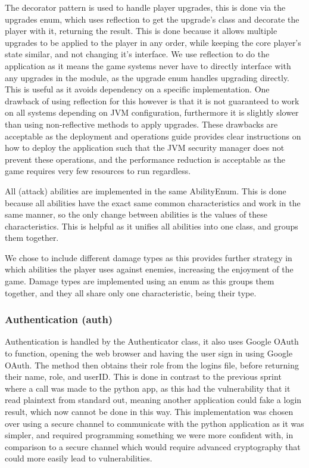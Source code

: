 The decorator pattern is used to handle player upgrades, this is done via the upgrades enum, which uses reflection to get the upgrade's class and decorate the player with it, returning the result. This is done because it allows multiple upgrades to be applied to the player in any order, while keeping the core player's state similar, and not changing it's interface. We use reflection to do the application as it means the game systems never have to directly interface with any upgrades in the module, as the upgrade enum handles upgrading directly. This is useful as it avoids dependency on a specific implementation. One drawback of using reflection for this however is that it is not guaranteed to work on all systems depending on JVM configuration, furthermore it is slightly slower than using non-reflective methods to apply upgrades. These drawbacks are acceptable as the deployment and operations guide provides clear instructions on how to deploy the application such that the JVM security manager does not prevent these operations, and the performance reduction is acceptable as the game requires very few resources to run regardless.

All (attack) abilities are implemented in the same AbilityEnum. This is done because all abilities have the exact same common characteristics and work in the same manner, so the only change between abilities is the values of these characteristics. This is helpful as it unifies all abilities into one class, and groups them together.

We chose to include different damage types as this provides further strategy in which abilities the player uses against enemies, increasing the enjoyment of the game. Damage types are implemented using an enum as this groups them together, and they all share only one characteristic, being their type.

\subsubsection{Authentication (auth)}

Authentication is handled by the Authenticator class, it also uses Google OAuth to function, opening the web browser and having the user sign in using Google OAuth. The method then obtains their role from the logins file, before returning their name, role, and userID. This is done in contrast to the previous sprint where a call was made to the python app, as this had the vulnerability that it read plaintext from standard out, meaning another application could fake a login result, which now cannot be done in this way. This implementation was chosen over using a secure channel to communicate with the python application as it was simpler, and required programming something we were more confident with, in comparison to a secure channel which would require advanced cryptography that could more easily lead to vulnerabilities.

